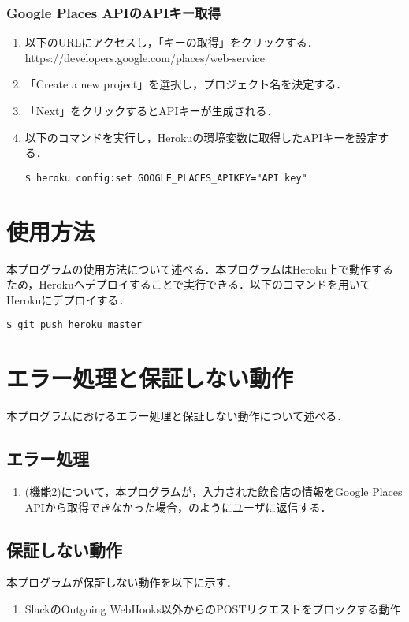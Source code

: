 \documentclass[12pt]{jsarticle}
\begin{document}
\subsubsection{Google Places APIのAPIキー取得}
\begin{enumerate}
\item 以下のURLにアクセスし，「キーの取得」をクリックする．\\
  https://developers.google.com/places/web-service
\item 「Create a new project」を選択し，プロジェクト名を決定する．
\item 「Next」をクリックするとAPIキーが生成される．
\item 以下のコマンドを実行し，Herokuの環境変数に取得したAPIキーを設定する．
\begin{verbatim}
$ heroku config:set GOOGLE_PLACES_APIKEY="API key"
\end{verbatim}
\end{enumerate}

\section{使用方法}
\label{usage}
本プログラムの使用方法について述べる．本プログラムはHeroku上で動作するため，Herokuへデプロイすることで実行できる．以下のコマンドを用いてHerokuにデプロイする．

\begin{verbatim}
$ git push heroku master
\end{verbatim}

\section{エラー処理と保証しない動作}
\label{error_handling}
本プログラムにおけるエラー処理と保証しない動作について述べる．

\subsection{エラー処理}
\begin{enumerate}
\item (機能2)について，本プログラムが，入力された飲食店の情報をGoogle Places APIから取得できなかった場合，のようにユーザに返信する．

\end{enumerate}

\subsection{保証しない動作}
本プログラムが保証しない動作を以下に示す．

\begin{enumerate}
\item SlackのOutgoing WebHooks以外からのPOSTリクエストをブロックする動作
\end{enumerate}



\end{document}
